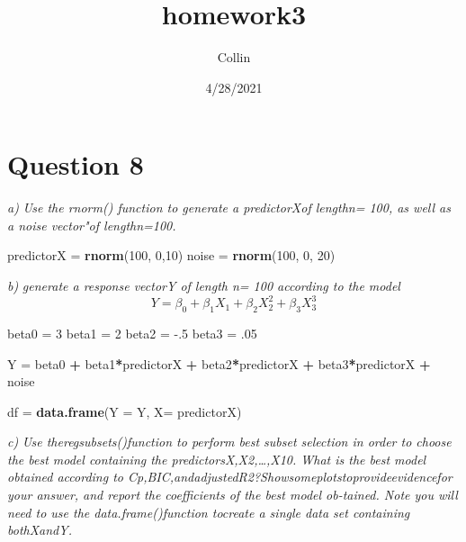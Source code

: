 \documentclass[
]{article}
\title{homework3}
\author{Collin}
\date{4/28/2021}
\newenvironment{Shaded}{\begin{snugshade}}{\end{snugshade}}
\newcommand{\DataTypeTok}[1]{\textcolor[rgb]{0.13,0.29,0.53}{#1}}
\newcommand{\DecValTok}[1]{\textcolor[rgb]{0.00,0.00,0.81}{#1}}
\newcommand{\FloatTok}[1]{\textcolor[rgb]{0.00,0.00,0.81}{#1}}
\newcommand{\KeywordTok}[1]{\textcolor[rgb]{0.13,0.29,0.53}{\textbf{#1}}}
\newcommand{\NormalTok}[1]{#1}
\newcommand{\OperatorTok}[1]{\textcolor[rgb]{0.81,0.36,0.00}{\textbf{#1}}}
\newcommand{\StringTok}[1]{\textcolor[rgb]{0.31,0.60,0.02}{#1}}
\begin{document}
\maketitle

\hypertarget{question-8}{%
\section{Question 8}\label{question-8}}

\emph{a)} \emph{Use the rnorm() function to generate a predictorXof
lengthn= 100, as well as a noise vector"of lengthn=100.}

\begin{Shaded}
\begin{Highlighting}[]
\NormalTok{predictorX =}\StringTok{ }\KeywordTok{rnorm}\NormalTok{(}\DecValTok{100}\NormalTok{, }\DecValTok{0}\NormalTok{,}\DecValTok{10}\NormalTok{)}
\NormalTok{noise =}\StringTok{ }\KeywordTok{rnorm}\NormalTok{(}\DecValTok{100}\NormalTok{, }\DecValTok{0}\NormalTok{, }\DecValTok{20}\NormalTok{)}
\end{Highlighting}
\end{Shaded}

\emph{b)} \emph{generate a response vectorY of length n= 100 according
to the model} \[
Y = \beta_{0} + \beta_{1}X_{1} + \beta_{2}X_{2}^2 + \beta_{3}X_{3}^3
\]

\begin{Shaded}
\begin{Highlighting}[]
\NormalTok{beta0 =}\StringTok{ }\DecValTok{3}
\NormalTok{beta1 =}\StringTok{ }\DecValTok{2}
\NormalTok{beta2 =}\StringTok{ }\FloatTok{-.5}
\NormalTok{beta3 =}\StringTok{ }\FloatTok{.05}

\NormalTok{Y =}\StringTok{ }\NormalTok{beta0 }\OperatorTok{+}\StringTok{ }\NormalTok{beta1}\OperatorTok{*}\NormalTok{predictorX }\OperatorTok{+}\StringTok{ }\NormalTok{beta2}\OperatorTok{*}\NormalTok{predictorX }\OperatorTok{+}\StringTok{ }\NormalTok{beta3}\OperatorTok{*}\NormalTok{predictorX }\OperatorTok{+}\StringTok{ }\NormalTok{noise}

\NormalTok{df =}\StringTok{ }\KeywordTok{data.frame}\NormalTok{(}\DataTypeTok{Y =}\NormalTok{ Y, }\DataTypeTok{X=}\NormalTok{ predictorX)}
\end{Highlighting}
\end{Shaded}

\emph{c)} \emph{Use theregsubsets()function to perform best subset
selection in order to choose the best model containing the
predictorsX,X2,\ldots,X10. What is the best model obtained according to
Cp,BIC,andadjustedR2?Showsomeplotstoprovideevidencefor your answer, and
report the coefficients of the best model ob-tained. Note you will need
to use the data.frame()function tocreate a single data set containing
bothXandY.}
\end{document}
